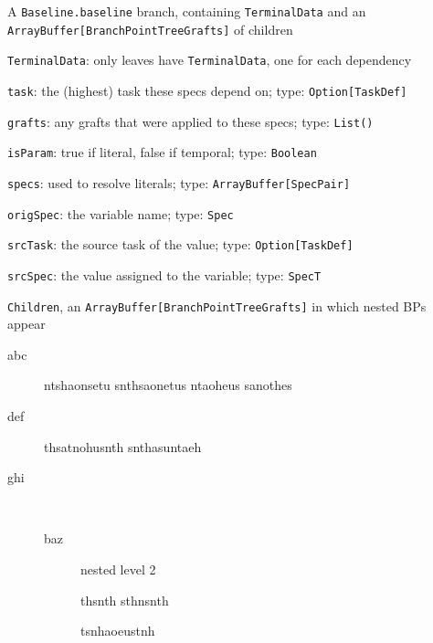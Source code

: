 \documentclass{report}
\begin{document}
        \quad \quad A \texttt{Baseline.baseline} branch, containing \texttt{TerminalData} and an \texttt{ArrayBuffer[BranchPointTreeGrafts]} of children
            
            \quad \quad \quad \texttt{TerminalData}: only leaves have \texttt{TerminalData}, one for each dependency
                
                \quad \quad \quad \quad \texttt{task}: the (highest) task these specs depend on; type: \texttt{Option[TaskDef]}
                
                \quad \quad \quad \quad \texttt{grafts}: any grafts that were applied to these specs; type: \texttt{List()}
                
                \quad \quad \quad \quad \texttt{isParam}: true if literal, false if temporal; type: \texttt{Boolean}
                
                \quad \quad \quad \quad \texttt{specs}: used to resolve literals; type: \texttt{ArrayBuffer[SpecPair]}
                    
                    \quad \quad \quad \quad \quad \texttt{origSpec}: the variable name; type: \texttt{Spec}
                    
                    \quad \quad \quad \quad \quad \texttt{srcTask}: the source task of the value; type: \texttt{Option[TaskDef]}
                    
                    \quad \quad \quad \quad \quad \texttt{srcSpec}: the value assigned to the variable; type: \texttt{SpecT}
            
            \quad \quad \quad \texttt{Children}, an \texttt{ArrayBuffer[BranchPointTreeGrafts]} in which nested BPs appear


\begin{description}
\item[abc] ntshaonsetu snthsaonetus ntaoheus sanothes
\item[def] thsatnohusnth snthasuntaeh
\item[ghi] \ \\
      \begin{description}
          \item[baz] nested level 2
          \item[] thsnth sthnsnth
          \item[] tsnhaoeustnh
      \end{description}
\end{description}
\end{document}
